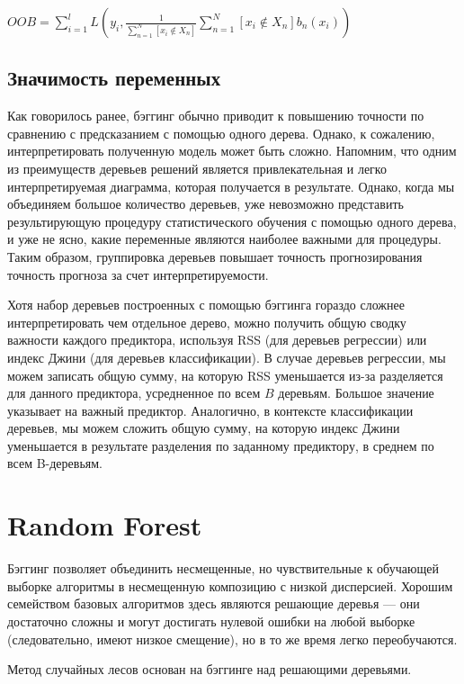 \documentclass{article}
\theoremstyle{definition}
\theoremstyle{theorem}
\theoremstyle{remark}
\theoremstyle{theorem}
\theoremstyle{example}
\theoremstyle{theorem}
\theoremstyle{theorem}
\theoremstyle{theorem}
\theoremstyle{theorem}
\begin{document}
$OOB = \sum_{i=1}^{l}L\left(y_i,\frac{1}{\sum_{n=1}^{N}\left[x_i \notin X_n\right]}\sum_{n=1}^{N}[x_i\notin X_n]b_n(x_i)\right)$

\subsection{Значимость переменных}

Как говорилось ранее, бэггинг обычно приводит к повышению точности по сравнению с предсказанием с помощью одного дерева. Однако, к сожалению, интерпретировать полученную модель может быть сложно. Напомним, что одним из преимуществ деревьев решений является привлекательная и легко интерпретируемая диаграмма, которая получается в результате. Однако, когда мы объединяем большое количество деревьев, уже невозможно представить результирующую процедуру статистического обучения с помощью одного дерева, и уже не ясно, какие переменные являются наиболее важными для процедуры. Таким образом, группировка деревьев повышает точность прогнозирования точность прогноза за счет интерпретируемости. 

Хотя набор деревьев построенных с помощью бэггинга гораздо сложнее интерпретировать чем отдельное дерево, можно получить общую сводку важности каждого предиктора, используя RSS (для деревьев регрессии) или индекс Джини (для деревьев классификации). В случае  деревьев регрессии, мы можем записать общую сумму, на которую RSS уменьшается из-за разделяется для данного предиктора, усредненное по всем $B$ деревьям. Большое значение указывает на важный предиктор. Аналогично, в контексте  классификации деревьев, мы можем сложить общую сумму, на которую индекс Джини  уменьшается в результате разделения по заданному предиктору, в среднем по всем B-деревьям.


\section{Random Forest}

Бэггинг позволяет объединить несмещенные, но чувствительные к обучающей выборке алгоритмы в несмещенную композицию с низкой дисперсией. Хорошим семейством базовых алгоритмов здесь являются решающие деревья --- они достаточно сложны и могут достигать нулевой ошибки на любой выборке (следовательно, имеют низкое смещение), но в то же время легко переобучаются.

Метод случайных лесов основан на бэггинге над решающими деревьями.
\end{document}
